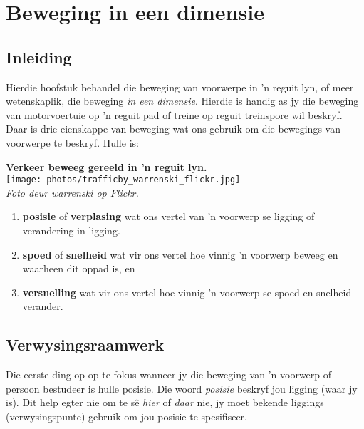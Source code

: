 \chapter{Beweging in een dimensie}
\label{chap:motion}
 
\section{Inleiding}

\begin{minipage}{.5\textwidth}
Hierdie hoofstuk behandel die beweging van voorwerpe in 'n reguit lyn, of meer wetenskaplik, die beweging \textsl{in een dimensie}. Hierdie is handig as jy die beweging van motorvoertuie op 'n reguit pad of treine op reguit treinspore wil beskryf. Daar is drie eienskappe van beweging wat ons gebruik om die bewegings van voorwerpe te beskryf. Hulle is:\par
\end{minipage}
\begin{minipage}{.5\textwidth}
\begin{center}
\textbf{Verkeer beweeg gereeld in 'n reguit lyn.}\\
 \texttt{[image: photos/trafficby\_warrenski\_flickr.jpg]}\\
\textit{Foto deur warrenski op Flickr.}
\end{center}
\end{minipage}
   
\begin{enumerate}[noitemsep, label=\textbf{\arabic*}. ] 
    \item \textbf{posisie} of \textbf{verplasing} wat ons vertel van 'n voorwerp se ligging of verandering in ligging.
    \item \textbf{spoed} of \textbf{snelheid} wat vir ons vertel hoe vinnig 'n voorwerp beweeg en waarheen dit oppad is, en
    \item \textbf{versnelling} wat vir ons vertel hoe vinnig 'n voorwerp se spoed en snelheid verander. 
\end{enumerate}



\section{Verwysingsraamwerk}
Die eerste ding op op te fokus wanneer jy die beweging van 'n voorwerp of persoon bestudeer is hulle posisie. Die woord \textsl{posisie} beskryf jou ligging (waar jy is). Dit help egter nie om te s\^e \textsl{hier} of \textsl{daar} nie, jy moet bekende liggings (verwysingspunte) gebruik om jou posisie te spesifiseer.

